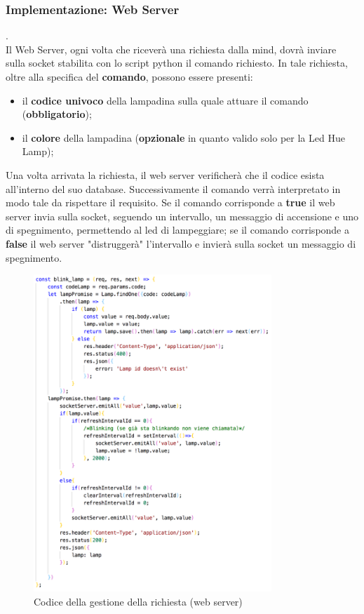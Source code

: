\documentclass{llncs}
\begin{document}
\subsubsection{Implementazione: Web Server} .
\label{ImplementazioneReq4WebServer}
\vspace*{1ex}
\\
Il Web Server, ogni volta che ricever\`a una richiesta dalla mind, dovr\`a inviare sulla socket stabilita con lo script python il comando richiesto. In tale richiesta, oltre alla specifica del \textbf{comando}, possono essere presenti:
\begin{itemize}
    \item il \textbf{codice univoco} della lampadina sulla quale attuare il comando (\textbf{obbligatorio});
    \item il \textbf{colore} della lampadina (\textbf{opzionale} in quanto valido solo per la Led Hue Lamp);
\end{itemize}
Una volta arrivata la richiesta, il web server verificher\`a che il codice esista all'interno del suo database. Successivamente il comando verr\`a interpretato in modo tale da rispettare il requisito. Se il comando corrisponde a \textbf{true} il web server invia sulla socket, seguendo un intervallo, un messaggio di accensione e uno di spegnimento, permettendo al led di lampeggiare; se il comando corrisponde a \textbf{false} il web server "distrugger\`a" l'intervallo e invier\`a sulla socket un messaggio di spegnimento.\\
\begin{figure}
    \centering
    \includegraphics[width=0.8\textwidth]{Immagini/Requisito4/BlinkLamp.png}
    \caption{Codice della gestione della richiesta (web server)}
    \label{fig:CodeWebServerReq4}
\end{figure}
\end{document}
